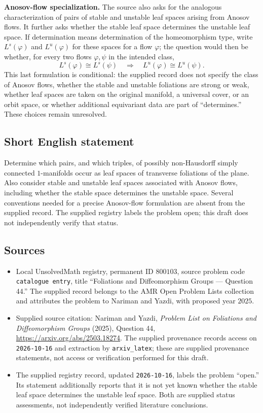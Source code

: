 \documentclass[11pt]{article}
\begin{document}
\textbf{Anosov-flow specialization.} The source also asks for the analogous characterization of pairs of stable and unstable leaf spaces arising from Anosov flows. It further asks whether the stable leaf space determines the unstable leaf space. If determination means determination of the homeomorphism type, write \(L^s(\varphi)\) and \(L^u(\varphi)\) for these spaces for a flow \(\varphi\); the question would then be whether, for every two flows \(\varphi,\psi\) in the intended class,
\[
L^s(\varphi)\cong L^s(\psi)
\quad\Longrightarrow\quad
L^u(\varphi)\cong L^u(\psi).
\]
This last formulation is conditional: the supplied record does not specify the class of Anosov flows, whether the stable and unstable foliations are strong or weak, whether leaf spaces are taken on the original manifold, a universal cover, or an orbit space, or whether additional equivariant data are part of ``determines.'' These choices remain unresolved.
\subsection{Short English statement}
Determine which pairs, and which triples, of possibly non-Hausdorff simply connected \(1\)-manifolds occur as leaf spaces of transverse foliations of the plane. Also consider stable and unstable leaf spaces associated with Anosov flows, including whether the stable space determines the unstable space. Several conventions needed for a precise Anosov-flow formulation are absent from the supplied record. The supplied registry labels the problem open; this draft does not independently verify that status.
\subsection{Sources}
\begin{itemize}
\item Local UnsolvedMath registry, permanent ID \(800103\), source problem code \texttt{catalogue entry}, title ``Foliations and Diffeomorphism Groups --- Question 44.'' The supplied record belongs to the AMR Open Problem Lists collection and attributes the problem to Nariman and Yazdi, with proposed year \(2025\).
\item Supplied source citation: Nariman and Yazdi, \emph{Problem List on Foliations and Diffeomorphism Groups} (2025), Question 44, \url{https://arxiv.org/abs/2503.18274}. The supplied provenance records access on \texttt{2026-10-16} and extraction by \texttt{arxiv\_latex}; these are supplied provenance statements, not access or verification performed for this draft.
\item The supplied registry record, updated \texttt{2026-10-16}, labels the problem ``open.'' Its statement additionally reports that it is not yet known whether the stable leaf space determines the unstable leaf space. Both are supplied status assessments, not independently verified literature conclusions.
\end{itemize}
\end{document}
